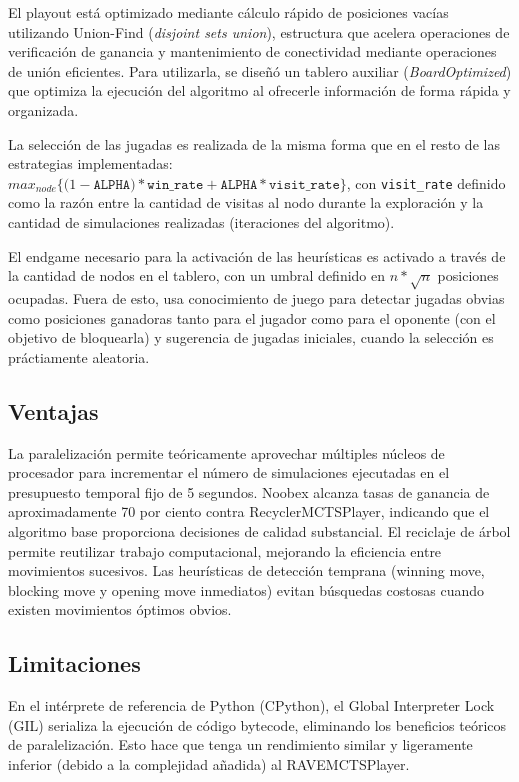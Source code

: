 \documentclass[12pt]{article}
\begin{document}
El playout está optimizado mediante cálculo rápido de posiciones vacías utilizando Union-Find (\textit{disjoint sets union}), estructura que acelera operaciones de verificación de ganancia y mantenimiento de conectividad mediante operaciones de unión eficientes. Para utilizarla, se diseñó un tablero auxiliar (\textit{BoardOptimized}) que optimiza la ejecución del algoritmo al ofrecerle información de forma rápida y organizada.

La selección de las jugadas es realizada de la misma forma que en el resto de las estrategias implementadas: $ max_{node} \{ (1 - \texttt{ALPHA)} * \texttt{win\_rate} + \texttt{ALPHA} * \texttt{visit\_rate}\}$, con \texttt{visit\_rate} definido como la razón entre la cantidad de visitas al nodo durante la exploración y la cantidad de simulaciones realizadas (iteraciones del algoritmo).

El endgame necesario para la activación de las heurísticas es activado a través de la cantidad de nodos en el tablero, con un umbral definido en $n * \sqrt{n}$ posiciones ocupadas. Fuera de esto, usa conocimiento de juego para detectar jugadas obvias como posiciones ganadoras tanto para el jugador como para el oponente (con el objetivo de bloquearla) y sugerencia de jugadas iniciales, cuando la selección es práctiamente aleatoria.

\subsection{Ventajas}

La paralelización permite teóricamente aprovechar múltiples núcleos de procesador para incrementar el número de simulaciones ejecutadas en el presupuesto temporal fijo de 5 segundos. Noobex alcanza tasas de ganancia de aproximadamente 70 por ciento contra RecyclerMCTSPlayer, indicando que el algoritmo base proporciona decisiones de calidad substancial. El reciclaje de árbol permite reutilizar trabajo computacional, mejorando la eficiencia entre movimientos sucesivos. Las heurísticas de detección temprana (winning move, blocking move y opening move inmediatos) evitan búsquedas costosas cuando existen movimientos óptimos obvios.

\subsection{Limitaciones}

En el intérprete de referencia de Python (CPython), el Global Interpreter Lock (GIL) serializa la ejecución de código bytecode, eliminando los beneficios teóricos de paralelización. Esto hace que tenga un rendimiento similar y ligeramente inferior (debido a la complejidad añadida) al RAVEMCTSPlayer.
\end{document}
